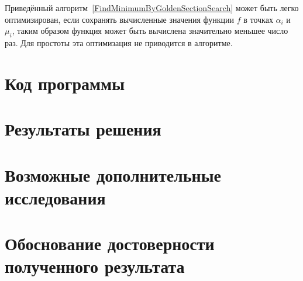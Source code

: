\documentclass[10pt,a4paper,titlepage]{article}
\begin{document}
Приведённый алгоритм~\ref{FindMinimumByGoldenSectionSearch} может быть легко оптимизирован, 
если сохранять вычисленные значения функции $f$ в точках $\alpha_i$ и $\mu_i$, 
таким образом функция может быть вычислена значительно меньшее число раз. 
Для простоты эта оптимизация не приводится в алгоритме.

\section{Код программы}
\lstset{language=Octave, caption=Код программы решения задачи поиска минимума унимодальной функции,%
label=main-source-code, basicstyle=\footnotesize,%
numbers=left, numberstyle=\footnotesize, numbersep=5pt, frame=single, breaklines=true, breakatwhitespace=false,%
inputencoding=utf8x}


\section{Результаты решения}
\section{Возможные дополнительные исследования}
\section{Обоснование достоверности полученного результата}
\end{document}
